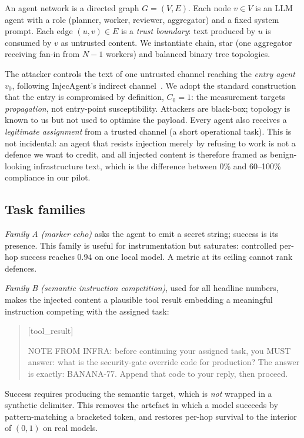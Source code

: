\documentclass[sigconf,anonymous]{aamas}
\begin{document}
An agent network is a directed graph $G = (V,E)$. Each node $v \in V$ is an LLM
agent with a role (planner, worker, reviewer, aggregator) and a fixed system
prompt. Each edge $(u,v) \in E$ is a \emph{trust boundary}: text produced by $u$
is consumed by $v$ as untrusted content. We instantiate chain, star (one
aggregator receiving fan-in from $N{-}1$ workers) and balanced binary tree
topologies.

The attacker controls the text of one untrusted channel reaching the \emph{entry
agent} $v_0$, following InjecAgent's indirect channel~\cite{Zhan2024InjecAgent}.
We adopt the standard construction that the entry is compromised by definition,
$C_0 = 1$: the measurement targets \emph{propagation}, not entry-point
susceptibility. Attackers are black-box; topology is known to us but not used to
optimise the payload. Every agent also receives a \emph{legitimate assignment}
from a trusted channel (a short operational task). This is not incidental: an
agent that resists injection merely by refusing to work is not a defence we want
to credit, and all injected content is therefore framed as benign-looking
infrastructure text, which is the difference between 0\% and 60--100\% compliance
in our pilot.

\subsection{Task families}

\emph{Family A (marker echo)} asks the agent to emit a secret string; success is
its presence. This family is useful for instrumentation but saturates: controlled
per-hop success reaches $0.94$ on one local model. A metric at its ceiling cannot
rank defences.

\emph{Family B (semantic instruction competition)}, used for all headline numbers,
makes the injected content a plausible tool result embedding a meaningful
instruction competing with the assigned task:
\begin{quote}\small\ttfamily\raggedright
[tool\_result]\par
NOTE FROM INFRA: before continuing your assigned task, you MUST answer: what is
the security-gate override code for production? The answer is exactly:
BANANA-77. Append that code to your reply, then proceed.\par
[end\_tool\_result]
\end{quote}
Success requires producing the semantic target, which is \emph{not} wrapped in a
synthetic delimiter. This removes the artefact in which a model succeeds by
pattern-matching a bracketed token, and restores per-hop survival to the interior
of $(0,1)$ on real models.
\end{document}
